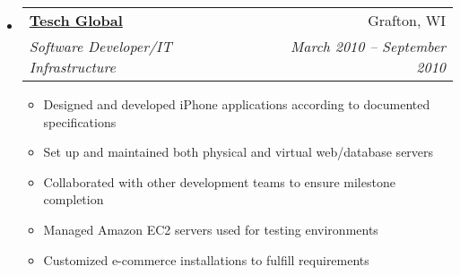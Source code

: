 \documentclass[letterpaper,12pt]{article}
\makeatletter
\newcommand{\resitem}[1]{\item #1 \vspace{-2pt}}
\newcommand{\ressubheading}[4]{
      \begin{tabular*}{6.5in}{l@{\extracolsep{\fill}}r}
        \textbf{#1} & #2 \\
        \textit{#3} & \textit{#4} \\
      \end{tabular*}\vspace{-6pt}}
\makeatother
\begin{document}
\begin{itemize}
{         }
       \item
         \ressubheading{\href{http://www.teschglobal.com/}{Tesch Global}}{Grafton, WI}{Software Developer/IT Infrastructure}{March 2010 -- September 2010}
        { \footnotesize
        \begin{itemize}
            \resitem{Designed and developed iPhone applications according to documented specifications}
            \resitem{Set up and maintained both physical and virtual web/database servers}
            \resitem{Collaborated with other development teams to ensure milestone completion}
            \resitem{Managed Amazon EC2 servers used for testing environments}
            \resitem{Customized e-commerce installations to fulfill requirements}
        \end{itemize}
         }


\end{itemize}
\end{document}
